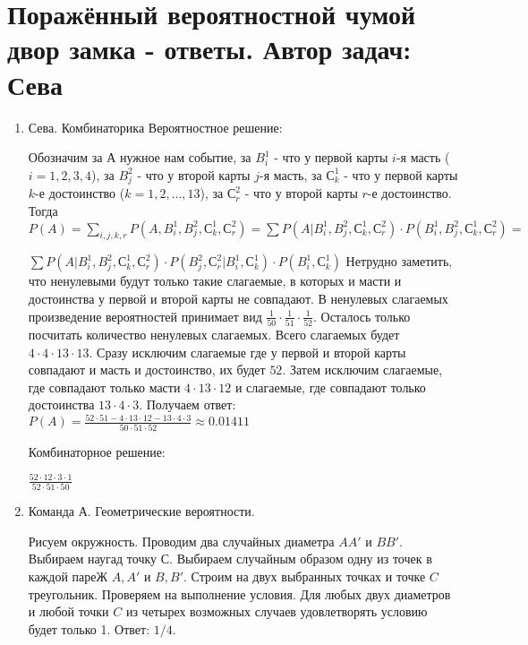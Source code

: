 \documentclass[a4paper,12pt]{article}
\begin{document}
\newpage

\section{Поражённый вероятностной чумой двор замка - ответы. Автор задач: Сева}

\begin{enumerate}
\item Сева. Комбинаторика
Вероятностное решение:

Обозначим за $А$ нужное нам событие, за $B_i^1$ - что у первой карты $i$-я масть ($i = 1,2,3,4$), за $B_j^2$ - что у второй карты $j$-я масть, за $С_k^1$ - что у первой карты $k$-е достоинство ($k = 1,2,\dots,13$), за $С_r^2$ - что у второй карты $r$-е достоинство. Тогда $P(A)=\sum_{i,j,k,r}P(A,B_i^1,B_j^2,С_k^1,С_r^2)=\sum P(A|B_i^1,B_j^2,С_k^1,С_r^2)\cdot P(B_i^1,B_j^2,С_k^1,С_r^2)=$

$\sum P(A|B_i^1,B_j^2,С_k^1,С_r^2)\cdot P(B_j^2,С_r^2|B_i^1,С_k^1)\cdot P(B_i^1,С_k^1)$ Нетрудно заметить, что ненулевыми будут только такие слагаемые, в которых и масти и достоинства у первой и второй карты не совпадают. В ненулевых слагаемых произведение вероятностей принимает вид $\frac{1}{50}\cdot\frac{1}{51}\cdot\frac{1}{52}$. Осталось только посчитать количество ненулевых слагаемых. Всего слагаемых будет $4\cdot4\cdot13\cdot13$. Сразу исключим слагаемые где у первой и второй карты совпадают и масть и достоинство, их будет $52$. Затем исключим слагаемые, где совпадают только масти $4\cdot13\cdot12$ и слагаемые, где совпадают только достоинства $13\cdot4\cdot3$. Получаем ответ: $P(A)=\frac{52\cdot51 - 4\cdot13\cdot12 - 13\cdot4\cdot3}{50\cdot51\cdot52}\approx0.01411$

Комбинаторное решение:

$\frac{52\cdot12\cdot3\cdot1}{52\cdot51\cdot50}$

\item Команда А. Геометрические вероятности.

Рисуем окружность. Проводим два случайных диаметра $AA'$ и $BB'$. Выбираем наугад точку $С$. Выбираем случайным образом одну из точек в каждой пареЖ $A,A'$ и $B,B'$. Строим на двух выбранных точках и точке $C$ треугольник. Проверяем на выполнение условия. Для любых двух диаметров и любой точки $C$ из четырех возможных случаев удовлетворять условию будет только 1. Ответ: $1/4$.


\end{enumerate}
\end{document}
